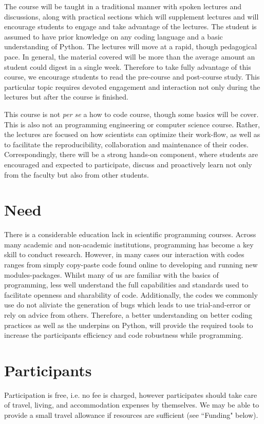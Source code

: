 \documentclass{article}[11pt]
\begin{document}
The course will be taught in a traditional manner with spoken lectures and 
discussions, along with practical sections which will supplement lectures and 
will encourage students to engage and take advantage of the lectures. The 
student is assumed to have prior knowledge on any coding language and a 
basic understanding of Python. The lectures will move at a rapid, though 
pedagogical pace. In general, the material covered will be more than the 
average amount an student could digest in a single week. Therefore to take 
fully advantage of this course, we encourage students to read the pre-course 
and post-course study. This particular topic requires devoted engagement and 
interaction not only during the lectures but after the course is finished. 

This course is not \textit{per se} a how to code course, though some basics 
will be cover. This is also not an programming engineering or computer science 
course. Rather, the lectures are focused on how scientists can optimize their 
work-flow, as well as to facilitate the reproducibility, collaboration and 
maintenance of their codes. Correspondingly, there will be a strong hands-on 
component, where students are encouraged and expected to participate, discuss 
and proactively learn not only from the faculty but also from other students. 

\section*{Need}
There is a considerable education lack in scientific programming courses. Across
many academic and non-academic institutions, programming has become a key skill
to conduct research. However, in many cases our interaction with codes ranges 
from simply copy-paste code found online to developing and running new modules-packages. 
Whilst many of us are familiar with the basics of programming, less well understand 
the full capabilities and standards used to facilitate openness and sharability of code. 
Additionally, the codes we commonly use do not aliviate the generation of bugs which 
leads to use trial-and-error or rely on advice from others. Therefore, a better 
understanding on better coding practices as well as the underpins on Python, 
will provide the required tools to increase the participants efficiency and code 
robustness while programming.

\section*{Participants}
Participation is free, i.e. no fee is charged, however participates should take care of travel, living, and accommodation expenses by themselves.
We may be able to provide a small travel allowance if resources are sufficient (see ``Funding" below).
\end{document}
